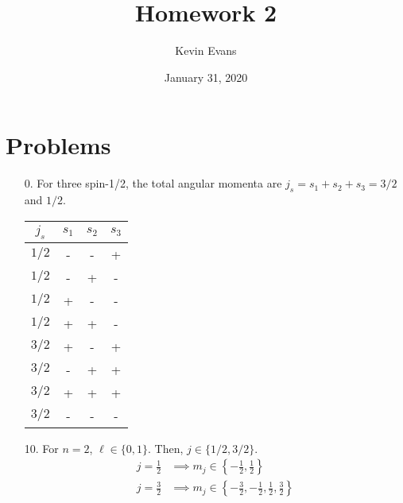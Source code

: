 \documentclass{homework}
\title{Homework 2}
\author{Kevin Evans}
\date{January 31, 2020}
\begin{document}
	\maketitle
	\section*{Problems}
	\begin{enumerate}
		\item[0.] For three spin-1/2, the total angular momenta are $j_s = s_1 + s_2 + s_3 = 3/2$ and $1/2$.
		
		\begin{tabular}{cccc}
			\toprule
			$j_s$ & $s_1$ & $s_2$ & $s_3$  \\
			\midrule
			$1/2$ & - & - & +  \\
			$1/2$ & - & + & - \\
			$1/2$ & + & - & - \\
			$1/2$ & + & + & - \\
			$3/2$ & + & - & + \\
			$3/2$ & - & + & + \\
			$3/2$ & + & + & + \\
			$3/2$ & - & - & - \\
			\bottomrule
		\end{tabular}
		
		\item[10.] For $n=2$, $\ell \in \{0, 1\}$. Then, $j \in \{ 1/2, 3/2 \}$.
			\begin{align*}
				j = \frac{1}{2} & \implies m_j \in \left\{ -\frac{1}{2}, \frac{1}{2} \right\} \\
				j = \frac{3}{2} & \implies m_j \in \left\{ -\frac{3}{2}, -\frac{1}{2}, \frac{1}{2}, \frac{3}{2} \right\}
			\end{align*}
			

\end{enumerate}
\end{document}

